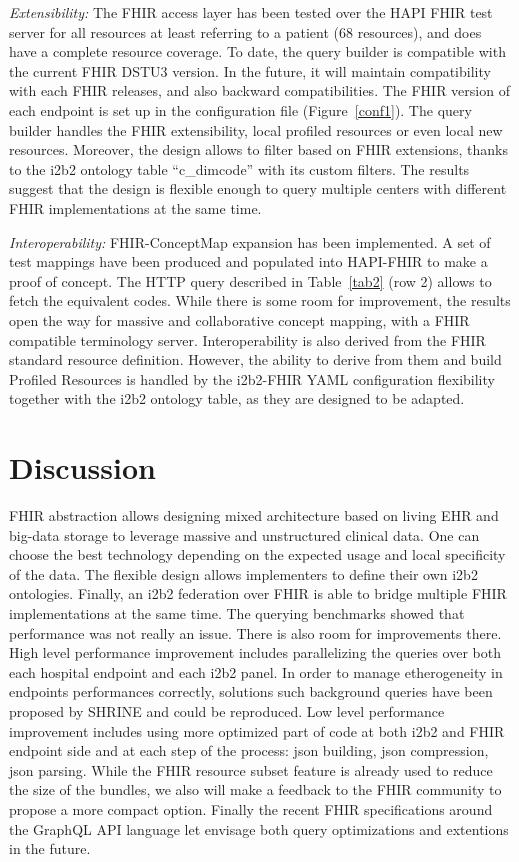 \documentclass{amia}
\begin{document}
\textit{Extensibility:} The FHIR access layer has been tested over the HAPI FHIR test server for all resources at least referring to a patient (68 resources), and does have a complete resource coverage. To date, the query builder is compatible with the current FHIR DSTU3 version. In the future, it will maintain compatibility with each FHIR releases, and also backward compatibilities. The FHIR version of each endpoint is set up in the configuration file (Figure~\ref{conf1}). The query builder handles the FHIR extensibility, local profiled resources or even local new resources. Moreover, the design allows to filter based on FHIR extensions, thanks to the i2b2 ontology table ``c\_dimcode'' with its custom filters. The results suggest that the design is flexible enough to query multiple centers with different FHIR implementations at the same time.

\textit{Interoperability: }FHIR-ConceptMap expansion has been implemented. A set of test mappings have been produced and populated into HAPI-FHIR to make a proof of concept. The HTTP query described in Table~\ref{tab2} (row 2)  allows to fetch the equivalent codes. While there is some room for improvement, the results open the way for massive and collaborative concept mapping, with a FHIR compatible terminology server. Interoperability is also derived from the FHIR standard resource definition. However, the ability to derive from them and build Profiled Resources is handled by the i2b2-FHIR YAML configuration flexibility together with the i2b2 ontology table, as they are designed to be adapted.

\section*{Discussion}

FHIR abstraction allows designing mixed architecture based on living EHR and big-data storage to leverage massive and unstructured clinical data. One can choose the best technology depending on the expected usage and local specificity of the data. The flexible design allows implementers to define their own i2b2 ontologies. Finally, an i2b2 federation over FHIR is able to bridge multiple FHIR implementations at the same time. The querying benchmarks showed that performance was not really an issue. There is also room for improvements there. High level performance improvement includes parallelizing the queries over both each hospital endpoint and each i2b2 panel. In order to manage etherogeneity in endpoints performances correctly, solutions such background queries have been proposed by SHRINE and could be reproduced. Low level performance improvement includes using more optimized part of code at both i2b2 and FHIR endpoint side and at each step of the process: json building, json compression, json parsing. While the FHIR resource subset feature is already used to reduce the size of the bundles, we also will make a feedback to the FHIR community to propose a more compact option. Finally the recent FHIR specifications around the GraphQL API language\cite{GRAPHQL} let envisage both query optimizations and extentions in the future. 
\end{document}
